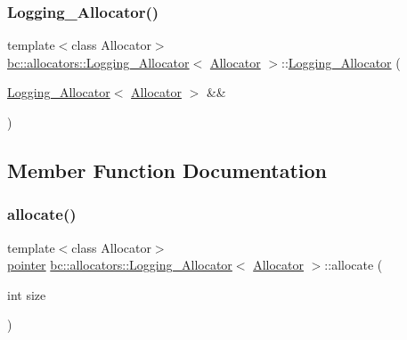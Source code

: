 \mbox{\label{structbc_1_1allocators_1_1Logging__Allocator_aa10a2fc90f25c0a8c50d3614859d88e0}} 
\subsubsection{\texorpdfstring{Logging\+\_\+\+Allocator()}{Logging\_Allocator()}\hspace{0.1cm}{\footnotesize\ttfamily [4/4]}}
{\footnotesize\ttfamily template$<$class Allocator$>$ \\
\hyperlink{structbc_1_1allocators_1_1Logging__Allocator}{bc\+::allocators\+::\+Logging\+\_\+\+Allocator}$<$ \hyperlink{classbc_1_1allocators_1_1Allocator}{Allocator} $>$\+::\hyperlink{structbc_1_1allocators_1_1Logging__Allocator}{Logging\+\_\+\+Allocator} (\begin{DoxyParamCaption}\item[{\hyperlink{structbc_1_1allocators_1_1Logging__Allocator}{Logging\+\_\+\+Allocator}$<$ \hyperlink{classbc_1_1allocators_1_1Allocator}{Allocator} $>$ \&\&}]{ }\end{DoxyParamCaption})\hspace{0.3cm}{\ttfamily [default]}}



\subsection{Member Function Documentation}
\mbox{\label{structbc_1_1allocators_1_1Logging__Allocator_ad2be32e15a233ea9aa8ea40fbed422f4}} 
\subsubsection{\texorpdfstring{allocate()}{allocate()}}
{\footnotesize\ttfamily template$<$class Allocator$>$ \\
\hyperlink{structbc_1_1allocators_1_1Allocator__Forwarder_ae9d48fbeb22a6686ad59128cf309d8bd}{pointer} \hyperlink{structbc_1_1allocators_1_1Logging__Allocator}{bc\+::allocators\+::\+Logging\+\_\+\+Allocator}$<$ \hyperlink{classbc_1_1allocators_1_1Allocator}{Allocator} $>$\+::allocate (\begin{DoxyParamCaption}\item[{int}]{size }\end{DoxyParamCaption})\hspace{0.3cm}{\ttfamily [inline]}}

